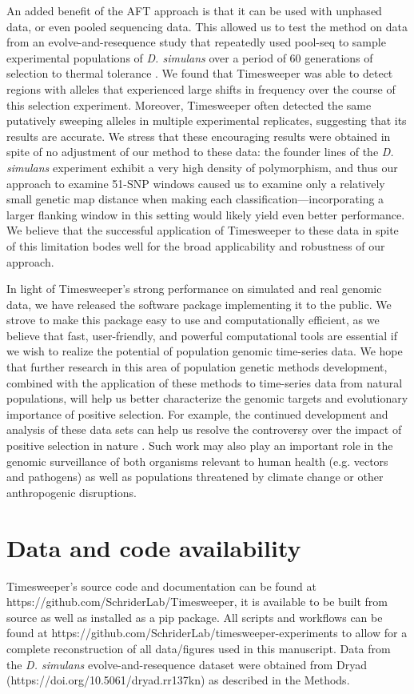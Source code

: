 An added benefit of the AFT approach is that it can be used with unphased data, or even pooled sequencing data. This allowed us to test the method on data from an evolve-and-resequence study that repeatedly used pool-seq to sample experimental populations of \textit{D. simulans} over a period of 60 generations of selection to thermal tolerance \cite{barghiGeneticRedundancyFuels2019}. We found that Timesweeper was able to detect regions with alleles that experienced large shifts in frequency over the course of this selection experiment. Moreover, Timesweeper often detected the same putatively sweeping alleles in multiple experimental replicates, suggesting that its results are accurate. We stress that these encouraging results were obtained in spite of no adjustment of our method to these data: the founder lines of the \textit{D. simulans} experiment exhibit a very high density of polymorphism, and thus our approach to examine 51-SNP windows caused us to examine only a relatively small genetic map distance when making each classification—incorporating a larger flanking window in this setting would likely yield even better performance. We believe that the successful application of Timesweeper to these data in spite of this limitation bodes well for the broad applicability and robustness of our approach.

In light of Timesweeper’s strong performance on simulated and real genomic data, we have released the software package implementing it to the public. We strove to make this package easy to use and computationally efficient, as we believe that fast, user-friendly, and powerful computational tools are essential if we wish to realize the potential of population genomic time-series data. We hope that further research in this area of population genetic methods development, combined with the application of these methods to time-series data from natural populations, will help us better characterize the genomic targets and evolutionary importance of positive selection. For example, the continued development and analysis of these data sets can help us resolve the controversy over the impact of positive selection in nature \cite{hahnSelectionTheoryMolecular2008,jensenImportanceNeutralTheory2019,kernNeutralTheoryLight2018}. Such work may also play an important role in the genomic surveillance of both organisms relevant to human health (e.g. vectors and pathogens) as well as populations threatened by climate change or other anthropogenic disruptions.

\section{Data and code availability}

Timesweeper’s source code and documentation can be found at https://github.com/SchriderLab/Timesweeper, it is available to be built from source as well as installed as a pip package. All scripts and workflows can be found at https://github.com/SchriderLab/timesweeper-experiments to allow for a complete reconstruction of all data/figures used in this manuscript. Data from the \textit{D. simulans} evolve-and-resequence dataset were obtained from Dryad \\
(https://doi.org/10.5061/dryad.rr137kn) as described in the Methods.
